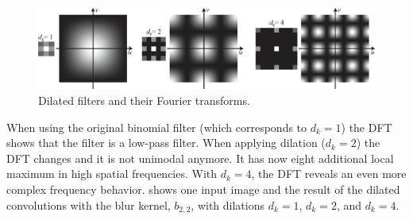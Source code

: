 \begin{figure}[h]
    \centerline{
        \includegraphics[width=1\linewidth]{./figures/convolutional_neural_nets/aliasing_dilated_kernel_binomial.eps}}
    \caption{Dilated filters and their Fourier transforms.}
    \label{fig:convolutional_neural_nets:aliasing_dilated_kernel_binomial}
\end{figure}
\vspace{-0.4cm}

When using the original binomial filter (which corresponds to $d_k=1$) the DFT shows that the filter is a low-pass filter. When applying dilation ($d_k=2$) the DFT changes and it is not unimodal anymore. It has now eight additional local maximum in high spatial frequencies. With $d_k=4$, the DFT reveals an even more complex frequency behavior. \Fig{\ref{fig:convolutional_neural_nets:dilated_blur_mit_dome_example}} shows one input image and the result of the dilated convolutions with the blur kernel, $b_{2,2}$, with dilations $d_k=1$, $d_k=2$, and $d_k=4$.
